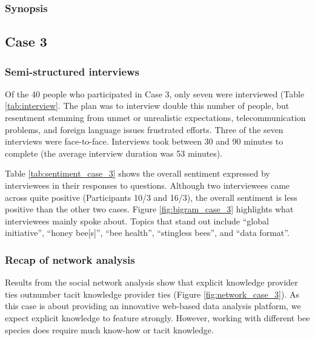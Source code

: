  





\subsubsection{Synopsis}



\subsection{Case 3}

\subsubsection{Semi-structured interviews}

Of the 40 people who participated in Case 3, only seven were interviewed (Table \ref{tab:interview}. The plan was to interview double this number of people, but resentment stemming from unmet or unrealistic expectations, telecommunication problems, and foreign language issues frustrated efforts. Three of the seven interviews were face-to-face. Interviews took between 30 and 90 minutes to complete (the average interview duration was 53 minutes). \medskip

Table \ref{tab:sentiment_case_3} shows the overall sentiment expressed by interviewees in their responses to questions. Although two interviewees came across quite positive (Participants 10/3 and 16/3), the overall sentiment is less positive than the other two cases. Figure \ref{fig:bigram_case_3} highlights what interviewees mainly spoke about. Topics that stand out include \enquote{global initiative}, \enquote{honey bee[s]}, \enquote{bee health}, \enquote{stingless bees}, and \enquote{data format}.

\subsubsection{Recap of network analysis}

Results from the social network analysis show that explicit knowledge provider ties outnumber tacit knowledge provider ties (Figure \ref{fig:network_case_3}). As this case is about providing an innovative web-based data analysis platform, we expect explicit knowledge to feature strongly. However, working with different bee species does require much know-how or tacit knowledge. \medskip

